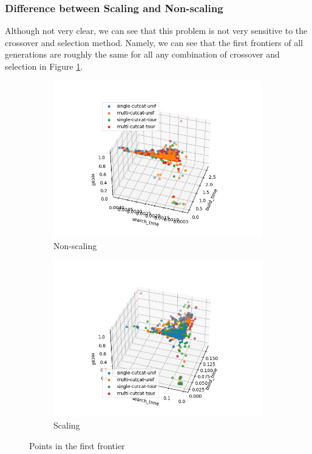 \subsubsection{Difference between Scaling and Non-scaling}

Although not very clear, we can see that this problem is not very sensitive to the crossover and selection method. Namely, we can see that the first frontiers of all generations are roughly the same for all any combination of crossover and selection in Figure \ref{fig:joint-frontiers}.

\begin{figure}[ht]
    \centering
    \hfill
    \begin{subfigure}{0.49\textwidth}
        \includegraphics[width=\textwidth]{../images/report/non-scaling-frontier.png}
        \caption{Non-scaling}
    \end{subfigure}
    \hfill
    \begin{subfigure}{0.49\textwidth}
        \includegraphics[width=\textwidth]{../images/report/scaling-frontier.png}
        \caption{Scaling}
    \end{subfigure}
    \hfill
    \caption{Points in the first frontier}
    \label{fig:joint-frontiers}
\end{figure}

